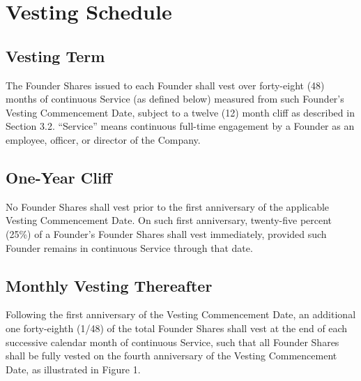 \section{Vesting Schedule}

\subsection{Vesting Term} The Founder Shares issued to each Founder shall vest over forty-eight (48) months of continuous Service (as defined below) measured from such Founder's Vesting Commencement Date, subject to a twelve (12) month cliff as described in Section 3.2. ``Service'' means continuous full-time engagement by a Founder as an employee, officer, or director of the Company.

\subsection{One-Year Cliff} No Founder Shares shall vest prior to the first anniversary of the applicable Vesting Commencement Date. On such first anniversary, twenty-five percent (25\%) of a Founder's Founder Shares shall vest immediately, provided such Founder remains in continuous Service through that date.

\subsection{Monthly Vesting Thereafter} Following the first anniversary of the Vesting Commencement Date, an additional one forty-eighth (1/48) of the total Founder Shares shall vest at the end of each successive calendar month of continuous Service, such that all Founder Shares shall be fully vested on the fourth anniversary of the Vesting Commencement Date, as illustrated in Figure 1.

